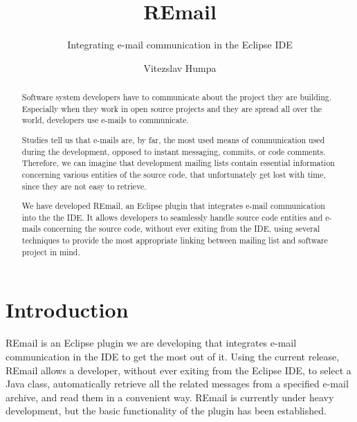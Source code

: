 \documentclass[]{usiinfthesis}
\title{REmail} %
\subtitle{Integrating e-mail communication in the Eclipse IDE} %
\author{Vitezslav Humpa} %
\begin{document}
 

\maketitle %

\frontmatter %

\begin{abstract}
Software system developers have to communicate about the project they are building. Especially when they work in open source projects and they are spread all over the world, developers use e-mails to communicate.

Studies tell us that e-mails are, by far, the most used means of communication used during the development, opposed to instant messaging, commits, or code comments. Therefore, we can imagine that development mailing lists contain essential information concerning various entities of the source code, that unfortunately get lost with time, since they are not easy to retrieve.

We have developed REmail, an Eclipse plugin that integrates e-mail communication into the the IDE. It allows developers to seamlessly handle source code entities and e-mails concerning the source code, without ever exiting from the IDE, using several techniques to provide the most appropriate linking between mailing list and software project in mind.

\end{abstract}


\begin{acknowledgements}
\end{acknowledgements}

\tableofcontents
\setlength{\parskip}{\baselineskip}
\mainmatter
\chapter{Introduction}

REmail is an Eclipse plugin we are developing that integrates e-mail communication in the IDE to get the most out of it. Using the current release, REmail allows a developer, without ever exiting from the Eclipse IDE, to select a Java class, automatically retrieve all the related messages from a specified e-mail archive, and read them in a convenient way. REmail is currently under heavy development, but the basic functionality of the plugin has been established.
\end{document}
